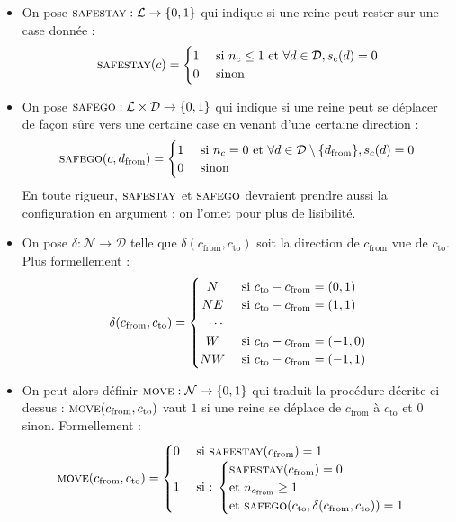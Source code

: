 \documentclass[11pt, openany]{article}
\newcommand{\La}{\mathcal{L}}
\newcommand{\Ne}{\mathcal{N}}
\newcommand{\D}{\mathcal{D}}
\newcommand{\Ss}{\textsc{safestay}}
\newcommand{\Sg}{\textsc{safego}}
\newcommand{\M}{\textsc{move}}
\begin{document}
 \begin{itemize}
  \item{On pose $\Ss : {\La}\to\{0,1\}$ qui indique si une reine peut rester sur une case donnée : \[
 \Ss(c) =
  \begin{cases} 
      \hfill 1    \hfill & \text{ si $n_c\leq 1$ et $\forall d \in \D, s_c(d)=0$} \\
      \hfill 0 \hfill & \text{ sinon} \\
  \end{cases}
\]}
 
  \item{On pose $\Sg :  {\La\times\D}\to\{0,1\}$ qui indique si une reine peut se déplacer de façon sûre vers une certaine case en venant d'une certaine direction : \[
 \Sg(c, d_{\mathrm {from}}) =
  \begin{cases} 
      \hfill 1    \hfill & \text{ si $n_c=0$ et $\forall d \in \D\setminus\{d_{\mathrm{from}}\}, s_c(d)=0$} \\
      \hfill 0 \hfill & \text{ sinon} \\
  \end{cases}
\]
 En toute rigueur, $\Ss$ et $\Sg$ devraient prendre aussi la configuration en argument : on l'omet pour plus de lisibilité.
}
\medskip
  \item{On pose $\delta :\Ne\to\D$ telle que $\delta(c_{\mathrm{from}}, c_{\mathrm{to}})$ soit la direction de $c_{\mathrm{from}}$ vue de $c_{\mathrm{to}}$. Plus formellement : \[
 \delta(c_{\mathrm{from}}, c_{\mathrm{to}}) =
  \begin{cases} 
    \hfill N    \hfill & \text{ si $c_{\mathrm{to}}-c_{\mathrm{from}}=(0,1)$} \\
    \hfill NE \hfill & \text{ si  $c_{\mathrm{to}}-c_{\mathrm{from}}=(1,1)$} \\
    \hfill \cdots & \\
    \hfill W \hfill & \text{ si  $c_{\mathrm{to}}-c_{\mathrm{from}}= (-1,0)$}\\
    \hfill NW \hfill & \text { si  $c_{\mathrm{to}}-c_{\mathrm{from}}=(-1,1)$}\\
  \end{cases}
\] }
  \item{On peut alors définir $\M :{\Ne}\to\{0,1\}$ qui traduit la procédure décrite ci-dessus : $\M(c_{\mathrm{from}}, c_{\mathrm{to}})$ vaut $1$ si une reine se déplace de $c_{\mathrm{from}}$ à $c_{\mathrm{to}}$ et $0$ sinon. Formellement : \[
    \M(c_{\mathrm{from}}, c_{\mathrm{to}}) = 
    \begin{cases}
      \hfill 0 \hfill & \text{ si $\Ss(c_{\mathrm{from}})=1$} \\
      \hfill 1 \hfill & \text{ si : }{ \begin{cases} \Ss(c_{\mathrm{from}})=0 \\\text{et $n_{c_{\mathrm{from}}}\geq 1$} \\ \text{et } \Sg(c_{\mathrm{to}}, \delta(c_{\mathrm{from}}, c_{\mathrm{to}}))=1\\ \end{cases}}\\


\end{cases}\]}
\end{itemize}
\end{document}
